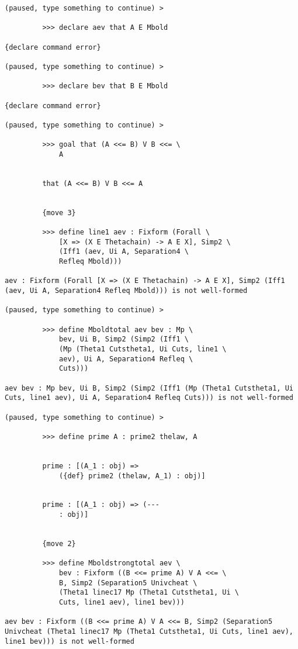 \documentclass[12pt]{article}
\begin{document}
\begin{verbatim}
(paused, type something to continue) >

         >>> declare aev that A E Mbold

{declare command error}

(paused, type something to continue) >

         >>> declare bev that B E Mbold

{declare command error}

(paused, type something to continue) >

         >>> goal that (A <<= B) V B <<= \
             A


         that (A <<= B) V B <<= A


         {move 3}

         >>> define line1 aev : Fixform (Forall \
             [X => (X E Thetachain) -> A E X], Simp2 \
             (Iff1 (aev, Ui A, Separation4 \
             Refleq Mbold)))

aev : Fixform (Forall [X => (X E Thetachain) -> A E X], Simp2 (Iff1 (aev, Ui A, Separation4 Refleq Mbold))) is not well-formed

(paused, type something to continue) >

         >>> define Mboldtotal aev bev : Mp \
             bev, Ui B, Simp2 (Simp2 (Iff1 \
             (Mp (Theta1 Cutstheta1, Ui Cuts, line1 \
             aev), Ui A, Separation4 Refleq \
             Cuts)))

aev bev : Mp bev, Ui B, Simp2 (Simp2 (Iff1 (Mp (Theta1 Cutstheta1, Ui Cuts, line1 aev), Ui A, Separation4 Refleq Cuts))) is not well-formed

(paused, type something to continue) >

         >>> define prime A : prime2 thelaw, A


         prime : [(A_1 : obj) => 
             ({def} prime2 (thelaw, A_1) : obj)]


         prime : [(A_1 : obj) => (--- 
             : obj)]


         {move 2}

         >>> define Mboldstrongtotal aev \
             bev : Fixform ((B <<= prime A) V A <<= \
             B, Simp2 (Separation5 Univcheat \
             (Theta1 linec17 Mp (Theta1 Cutstheta1, Ui \
             Cuts, line1 aev), line1 bev)))

aev bev : Fixform ((B <<= prime A) V A <<= B, Simp2 (Separation5 Univcheat (Theta1 linec17 Mp (Theta1 Cutstheta1, Ui Cuts, line1 aev), line1 bev))) is not well-formed


\end{verbatim}
\end{document}
